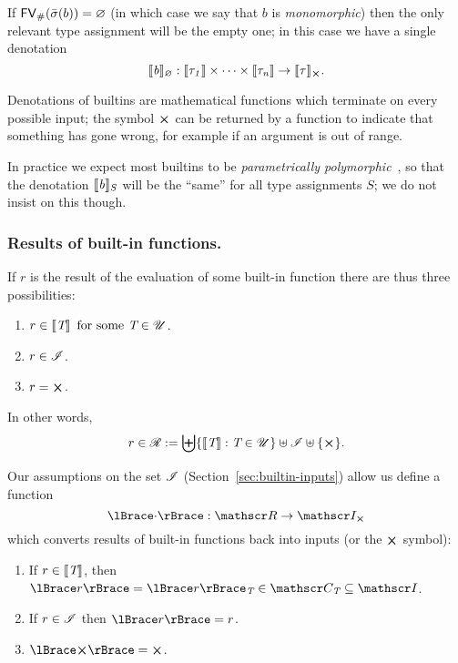 \medskip
\noindent If $\mathsf{FV}_{\#}(\bar{\sigma}(b)) = \varnothing$ (in which case we say that $b$ is
\textit{monomorphic}) then the only relevant type assignment will be the empty
one; in this case we have a single denotation
$$
\denote{b}_\varnothing: \denote{\tau_1} \times \cdots \times \denote{\tau_n} \rightarrow \withError{\denote{\tau}}.
$$

\smallskip
\noindent Denotations of builtins are mathematical functions which terminate on
every possible input; the symbol $\errorX$ can be returned by a function to
indicate that something has gone wrong, for example if an argument is out of
range.

\smallskip
\noindent In practice we expect most builtins to be \textit{parametrically
  polymorphic}~\cite{Wadler-theorems-for-free, Reynolds-parametric}, so that the
denotation $\llbracket\mathit{b}\rrbracket_S$ will be the ``same'' for all type assignments $S$; we do
not insist on this though.

\subsubsection{Results of built-in functions.}
\label{sec:builtin-results}
If $r$ is the result of the evaluation of some built-in function there are thus
three possibilities:
\begin{enumerate}
\item $r \in \llbracket\mathit{\textit{T}}\rrbracket \enspace \text{for some $\textit{T} \in \mathscr{U}$}$.
\item $r \in \mathscr{I}$.
\item $r = \errorX$.
\end{enumerate}
In other words,
$$
r \in \R := \bigdisj\{\denote{\tn}: \tn \in \Uni \} \disj \Inputs \disj \{\errorX\}.
$$

\noindent Our assumptions on the set $\mathscr{I}$
(Section~\ref{sec:builtin-inputs}) allow us define a function
$$
\reify{\cdot}: \R \rightarrow \withError{\Inputs}
$$
which converts results of built-in functions back into inputs (or the $\errorX$ symbol):
\begin{enumerate}
\item If $r \in \llbracket\mathit{\textit{T}}\rrbracket$, then $\reify{r} = \reify{r}_{\tn} \in \Con{\tn} \subseteq \Inputs$.
\item If $r \in \mathscr{I}$ then  $\reify{r} = r$.
\item $\reify{\errorX} = \errorX$.
\end{enumerate}%

